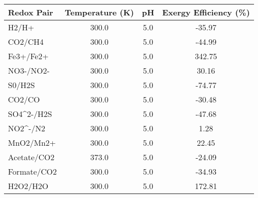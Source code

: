 \begin{tabular}{lccc}
\toprule
Redox Pair & Temperature (K) & pH & Exergy Efficiency (\%) \\ 
\midrule
H2/H+ & 300.0 & 5.0 & -35.97 \\ 
CO2/CH4 & 300.0 & 5.0 & -44.99 \\ 
Fe3+/Fe2+ & 300.0 & 5.0 & 342.75 \\ 
NO3-/NO2- & 300.0 & 5.0 & 30.16 \\ 
S0/H2S & 300.0 & 5.0 & -74.77 \\ 
CO2/CO & 300.0 & 5.0 & -30.48 \\ 
SO4^2-/H2S & 300.0 & 5.0 & -47.68 \\ 
NO2^-/N2 & 300.0 & 5.0 & 1.28 \\ 
MnO2/Mn2+ & 300.0 & 5.0 & 22.45 \\ 
Acetate/CO2 & 373.0 & 5.0 & -24.09 \\ 
Formate/CO2 & 300.0 & 5.0 & -34.93 \\ 
H2O2/H2O & 300.0 & 5.0 & 172.81 \\ 
\bottomrule
\end{tabular}
